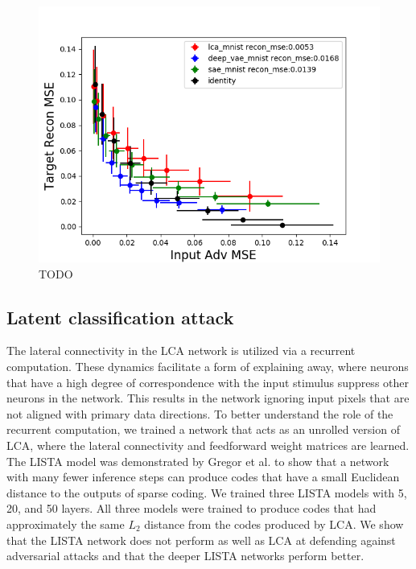 %
%

\begin{figure}[h]\label{fig:ch4_kos_attack}
\begin{center}
\centerline{\includegraphics[width=\columnwidth]{figures/recon_mult_tradeoff.png}}
\end{center}
\caption{TODO}
\end{figure}

\subsection{Latent classification attack}
The lateral connectivity in the LCA network is utilized via a recurrent computation. These dynamics facilitate a form of explaining away, where neurons that have a high degree of correspondence with the input stimulus suppress other neurons in the network. This results in the network ignoring input pixels that are not aligned with primary data directions. To better understand the role of the recurrent computation, we trained a network that acts as an unrolled version of LCA, where the lateral connectivity and feedforward weight matrices are learned. The LISTA model was demonstrated by Gregor et al. \citeyearpar{gregor2010learning} to show that a network with many fewer inference steps can produce codes that have a small Euclidean distance to the outputs of sparse coding. We trained three LISTA models with 5, 20, and 50 layers. All three models were trained to produce codes that had approximately the same $L_{2}$ distance from the codes produced by LCA. We show that the LISTA network does not perform as well as LCA at defending against adversarial attacks and that the deeper LISTA networks perform better.

